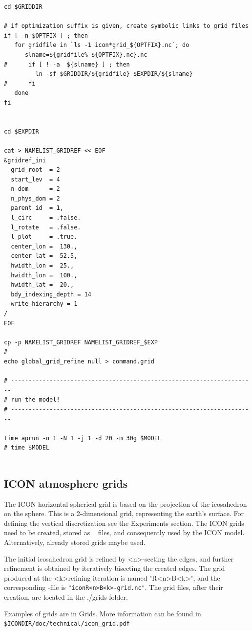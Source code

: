 \begin{Verbatim}[frame=single]
cd $GRIDDIR

# if optimization suffix is given, create symbolic links to grid files
if [ -n $OPTFIX ] ; then
   for gridfile in `ls -1 icon*grid_${OPTFIX}.nc`; do
      slname=${gridfile%_${OPTFIX}.nc}.nc
#      if [ ! -a  ${slname} ] ; then
         ln -sf $GRIDDIR/${gridfile} $EXPDIR/${slname}
#      fi
   done
fi


cd $EXPDIR

cat > NAMELIST_GRIDREF << EOF
&gridref_ini 
  grid_root  = 2
  start_lev  = 4
  n_dom      = 2
  n_phys_dom = 2
  parent_id  = 1,
  l_circ     = .false.
  l_rotate   = .false.
  l_plot     = .true.
  center_lon =  130.,
  center_lat =  52.5,
  hwidth_lon =  25.,
  hwidth_lon =  100.,
  hwidth_lat =  20.,
  bdy_indexing_depth = 14
  write_hierarchy = 1
/
EOF

cp -p NAMELIST_GRIDREF NAMELIST_GRIDREF_$EXP
#
echo global_grid_refine null > command.grid

# ----------------------------------------------------------------------
# run the model!
# ----------------------------------------------------------------------

time aprun -n 1 -N 1 -j 1 -d 20 -m 30g $MODEL
# time $MODEL


\end{Verbatim}

\subsection{ICON atmosphere grids}

The ICON horizontal spherical grid is based on the projection of the icosahedron on the sphere. This is a 2-dimensional grid, representing the earth's surface. For defining the vertical discretization see the Experiments section. The ICON grids need to be created, stored as \netcdf~ files, and consequently used by the ICON model. Alternatively, already stored grids maybe used.

The initial icosahedron grid is refined by \textless n\textgreater -secting the edges, and further refinement is obtained by iteratively bisecting the created edges. The grid produced at the \textless k\textgreater refining iteration is named "R\textless n\textgreater B\textless k\textgreater", and the corresponding \netcdf -file is \verb+"iconR<n>B<k>-grid.nc"+. The grid files, after their creation, are located in the ./grids folder.

Examples of grids are in Grids. More information can be found in\\ 
\verb+$ICONDIR/doc/technical/icon_grid.pdf+

